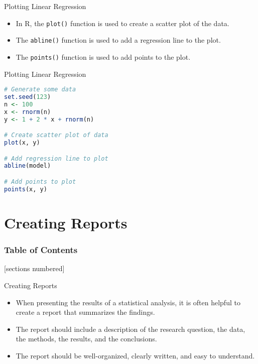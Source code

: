 \documentclass[serif, 9pt, aspectratio=32]{beamer}
\begin{document}
\begin{frame}{Plotting Linear Regression}
    \begin{itemize}
        \setlength{\itemsep}{2em}
        \item In R, the \texttt{plot()} function is used to create a scatter plot of the data.
        \item The \texttt{abline()} function is used to add a regression line to the plot.
        \item The \texttt{points()} function is used to add points to the plot.
    \end{itemize}
\end{frame}

\begin{frame}[fragile]{Plotting Linear Regression}
    \begin{lstlisting}[language=R]
# Generate some data
set.seed(123)
n <- 100
x <- rnorm(n)
y <- 1 + 2 * x + rnorm(n)

# Create scatter plot of data
plot(x, y)

# Add regression line to plot
abline(model)

# Add points to plot
points(x, y)
    \end{lstlisting}
\end{frame}

\section{Creating Reports}

\begin{frame}
    \frametitle{Table of Contents}
    [sections numbered]
    \tableofcontents[currentsection]
\end{frame}

\begin{frame}{Creating Reports}
    \begin{itemize}
        \setlength{\itemsep}{2em}
        \item When presenting the results of a statistical analysis, it is often helpful to create a report that summarizes the findings.
        \item The report should include a description of the research question, the data, the methods, the results, and the conclusions.
        \item The report should be well-organized, clearly written, and easy to understand.
    \end{itemize}
\end{frame}
\end{document}
